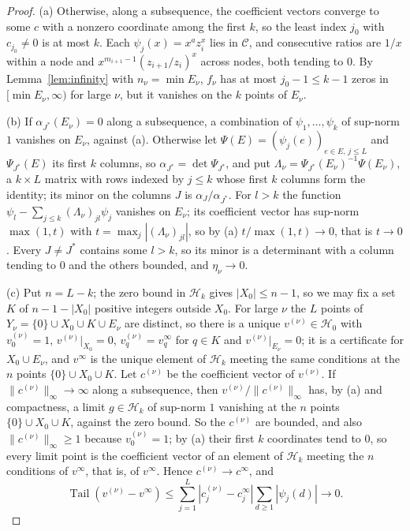 \documentclass[11pt]{article}
\theoremstyle{definition}
\theoremstyle{plain}
\DeclareMathOperator{\Tail}{Tail}
\begin{document}
\begin{proof}
(a) Otherwise, along a subsequence, the coefficient vectors converge to some
$c$ with a nonzero coordinate among the first $k$, so the least index $j_0$
with $c_{j_0}\ne0$ is at most $k$.  Each $\psi_j(x)=x^az_i^x$ lies in
$\mathcal C$, and consecutive ratios are $1/x$ within a node and
$x^{m_{i+1}-1}(z_{i+1}/z_i)^x$ across nodes, both tending to $0$.  By
Lemma~\ref{lem:infinity} with $n_\nu=\min E_\nu$, $f_\nu$ has at most
$j_0-1\le k-1$ zeros in $[\min E_\nu,\infty)$ for large $\nu$, but it vanishes
on the $k$ points of $E_\nu$.

(b) If $\alpha_{J^*}(E_\nu)=0$ along a subsequence, a combination of
$\psi_1,\ldots,\psi_k$ of sup-norm $1$ vanishes on $E_\nu$, against (a).
Otherwise let $\Psi(E)=(\psi_j(e))_{e\in E,\,j\le L}$ and $\Psi_{J^*}(E)$ its
first $k$ columns, so $\alpha_{J^*}=\det\Psi_{J^*}$, and put
$\Lambda_\nu=\Psi_{J^*}(E_\nu)^{-1}\Psi(E_\nu)$, a $k\times L$ matrix with rows
indexed by $j\le k$ whose first $k$ columns form the identity; its minor on
the columns $J$ is $\alpha_J/\alpha_{J^*}$.  For
$l>k$ the function $\psi_l-\sum_{j\le k}(\Lambda_\nu)_{jl}\psi_j$ vanishes on
$E_\nu$; its coefficient vector has sup-norm $\max(1,t)$ with
$t=\max_j|(\Lambda_\nu)_{jl}|$, so by (a) $t/\max(1,t)\to0$, that is $t\to0$.
Every $J\ne J^*$ contains some $l>k$, so its minor is a determinant with a
column tending to $0$ and the others bounded, and $\eta_\nu\to0$.

(c) Put $n=L-k$; the zero bound in $\mathcal H_k$ gives $|X_0|\le n-1$, so
we may fix a set $K$ of $n-1-|X_0|$ positive integers outside $X_0$.  For
large $\nu$ the $L$ points of $Y_\nu=\{0\}\cup X_0\cup K\cup E_\nu$ are
distinct, so there is a unique $v^{(\nu)}\in\mathcal H_0$ with
$v^{(\nu)}_0=1$, $v^{(\nu)}|_{X_0}=0$, $v^{(\nu)}_q=v^\infty_q$ for $q\in K$
and $v^{(\nu)}|_{E_\nu}=0$; it is a certificate for $X_0\cup E_\nu$, and
$v^\infty$ is the unique element of $\mathcal H_k$ meeting the same
conditions at the $n$ points $\{0\}\cup X_0\cup K$.  Let $c^{(\nu)}$ be the
coefficient vector of $v^{(\nu)}$.  If $\|c^{(\nu)}\|_\infty\to\infty$ along
a subsequence, then $v^{(\nu)}/\|c^{(\nu)}\|_\infty$ has, by (a) and
compactness, a limit $g\in\mathcal H_k$ of sup-norm $1$ vanishing at the $n$
points $\{0\}\cup X_0\cup K$, against the zero bound.  So the $c^{(\nu)}$ are
bounded, and also $\|c^{(\nu)}\|_\infty\ge1$ because $v^{(\nu)}_0=1$; by (a)
their first $k$ coordinates tend to $0$, so every limit point is the
coefficient vector of an element of $\mathcal H_k$ meeting the $n$ conditions
of $v^\infty$, that is, of $v^\infty$.  Hence $c^{(\nu)}\to c^\infty$, and
\[
  \Tail(v^{(\nu)}-v^\infty)\le\sum_{j=1}^L|c^{(\nu)}_j-c^\infty_j|
  \sum_{d\ge1}|\psi_j(d)|\longrightarrow0 .
\]
\end{proof}
\end{document}
